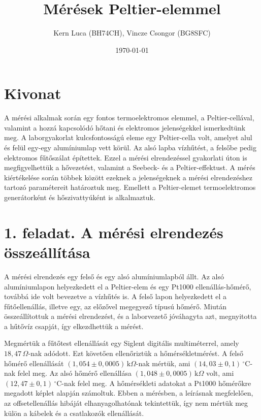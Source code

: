\documentclass[11pt]{article}
\title{Mérések Peltier-elemmel}
\author{Kern Luca (BH74CH), Vincze Csongor (BG8SFC)}
\date{\today}
\begin{document}
\maketitle

\section*{Kivonat}

A mérési alkalmak során egy fontos termoelektromos elemmel, a Peltier-cellával, valamint a hozzá kapcsolódó hőtani és elektromos jelenségekkel ismerkedtünk meg. A laborgyakorlat kulcsfontosságú eleme egy Peltier-cella volt, amelyet alul és felül egy-egy alumíniumlap vett körül. Az alsó lapba vízhűtést, a felsőbe pedig elektromos fűtőszálat építettek. Ezzel a mérési elrendezéssel gyakorlati úton is megfigyelhettük a hővezetést, valamint a Seebeck- és a Peltier-effektust. A mérés kiértékelése során többek között ezeknek a jelenségeknek a mérési elrendezéshez tartozó paramétereit határoztuk meg. Emellett a Peltier-elemet termoelektromos generátorként és hőszivattyúként is alkalmaztuk.

\section*{1. feladat. A mérési elrendezés összeállítása}

A mérési elrendezés egy felső és egy alsó alumíniumlapból állt. Az alsó alumíniumlapon helyezkedett el a Peltier-elem és egy Pt1000 ellenállás-hőmérő, továbbá ide volt bevezetve a vízhűtés is. A felső lapon helyezkedett el a fűtőellenállás, illetve egy, az előzővel megegyező típusú hőmérő. Miután összeállítottuk a mérési elrendezést, és a laborvezető jóváhagyta azt, megnyitotta a hűtővíz csapját, így elkezdhettük a mérést.

Megmértük a fűtőtest ellenállását egy Siglent digitális multiméterrel, amely $18,47 \,\Omega$-nak adódott. Ezt követően ellenőriztük a hőmérsékletmérést. A felső hőmérő ellenállását $(1,054 \pm 0,0005) \,\mathrm{k}\Omega$-nak mértük, ami $(14,03 \pm 0,1) \,^\circ\mathrm{C}$-nak felel meg. Az alsó hőmérő ellenállása $(1,048 \pm 0,0005) \,\mathrm{k}\Omega$ volt, ami $(12,47 \pm 0,1) \,^\circ\mathrm{C}$-nak felel meg. A hőmérsékleti adatokat a Pt1000 hőmérőkre megadott képlet alapján számoltuk. Ebben a mérésben, a leírásnak megfelelően, az offsetellenállás hibáját elhanyagolhatónak tekintettük, így nem mértük meg külön a kábelek és a csatlakozók ellenállását.
\end{document}
